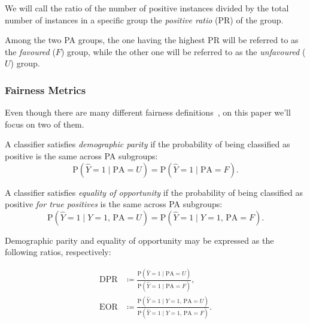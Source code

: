 \begin{definition}
  We will call the ratio of the number of positive instances divided by the total number of instances in a specific group the \emph{positive ratio} (PR) of the group.
\end{definition}

\begin{definition}
  Among the two PA groups, the one having the highest PR will be referred to as the \emph{favoured} ($F$) group, while the other one will be referred to as the \emph{unfavoured} ($U$) group.
\end{definition}

\subsubsection{Fairness Metrics}

Even though there are many different fairness definitions~\cite{kusner2017counterfactual,kilbertus2017avoiding}, on this paper we'll focus on two of them.

\begin{definition}
  A classifier satisfies \emph{demographic parity} if the probability of being classified as positive is the same across PA subgroups:
  \begin{equation}
    \label{eq:dp}
    \text{P} \left( \hat{Y} = 1 \mid \text{PA} = U \right) =
    \text{P} \left( \hat{Y} = 1 \mid \text{PA} = F \right).
  \end{equation}
\end{definition}

\begin{definition}
  A classifier satisfies \emph{equality of opportunity} if the probability of being classified as positive \emph{for true positives} is the same across PA subgroups:
  \begin{equation}
    \label{eq:eo}
    \text{P} \left( \hat{Y} = 1 \mid Y = 1,\, \text{PA} = U \right) =
    \text{P} \left( \hat{Y} = 1 \mid Y = 1,\, \text{PA} = F \right).
  \end{equation}
\end{definition}

Demographic parity and equality of opportunity may be expressed as the following ratios, respectively:
\begin{definition}
  \label{def:fratios}
  \begin{align}
    \text{DPR} &\coloneqq \frac
    {\text{P} \left( \hat{Y} = 1 \mid \text{PA} = U \right)}
    {\text{P} \left( \hat{Y} = 1 \mid \text{PA} = F \right)}, \\
    \text{EOR} &\coloneqq \frac
    {\text{P} \left( \hat{Y} = 1 \mid Y = 1,\, \text{PA} = U \right)}
    {\text{P} \left( \hat{Y} = 1 \mid Y = 1,\, \text{PA} = F \right)}.
  \end{align}
\end{definition}

